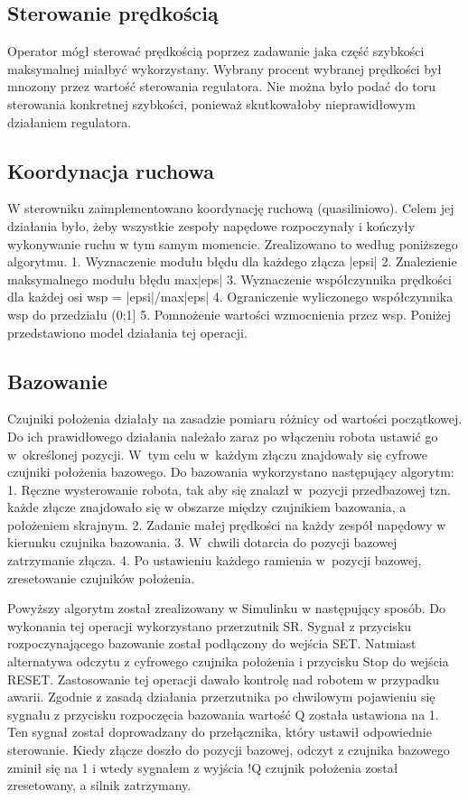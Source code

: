 \subsection{Sterowanie prędkością}
\label{subsec:sterowaniePredkoscia}

Operator mógł sterować prędkością poprzez zadawanie jaka część szybkości maksymalnej miałbyć wykorzystany. Wybrany procent wybranej prędkości był mnozony przez wartość sterowania regulatora. Nie można było podać do toru sterowania konkretnej szybkości, ponieważ skutkowałoby nieprawidłowym działaniem regulatora.

\subsection{Koordynacja ruchowa}
\label{subsec:koordynacjaRuchowa}

W sterowniku zaimplementowano koordynację ruchową (quasiliniowo). Celem jej działania było, żeby wszystkie zespoły napędowe rozpoczynały i kończyły wykonywanie ruchu w tym samym momencie. Zrealizowano to według poniższego algorytmu.
1. Wyznaczenie modułu błędu dla każdego złącza |epsi|
2. Znalezienie maksymalnego modułu błędu max|eps|
3. Wyznaczenie współczynnika prędkości dla każdej osi wsp = |epsi|/max|eps|
4. Ograniczenie wyliczonego współczynnika wsp do przedziału (0;1] 
5. Pomnożenie wartości wzmocnienia przez wsp.
Poniżej przedstawiono model działania tej operacji.

\subsection{Bazowanie}
\label{subsec:Bazowanie}

Czujniki położenia działały na zasadzie pomiaru różnicy od wartości początkowej. Do ich prawidłowego działania należało zaraz po włączeniu robota ustawić go w~określonej pozycji. W~tym celu w~każdym złączu znajdowały się cyfrowe czujniki położenia bazowego. Do bazowania wykorzystano następujący algorytm:
1. Ręczne wysterowanie robota, tak aby się znalazł w~pozycji przedbazowej tzn. każde złącze znajdowało się w obszarze między czujnikiem bazowania, a położeniem skrajnym.
2. Zadanie małej prędkości na każdy zespół napędowy w kierunku czujnika bazowania.
3. W~chwili dotarcia do pozycji bazowej zatrzymanie złącza.
4. Po ustawieniu każdego ramienia w~pozycji bazowej, zresetowanie czujników położenia.

Powyższy algorytm został zrealizowany w Simulinku w następujący sposób.
Do wykonania tej operacji wykorzystano przerzutnik SR. Sygnał z przycisku rozpoczynającego bazowanie został podłączony do wejścia SET. Natmiast alternatywa odczytu z cyfrowego czujnika położenia i przycisku Stop do wejścia RESET. Zastosowanie tej operacji dawało kontrolę nad robotem w przypadku awarii. Zgodnie z zasadą działania przerzutnika po chwilowym pojawieniu się sygnału z przycisku rozpoczęcia bazowania wartość Q została ustawiona na 1. Ten sygnał został doprowadzany do przełącznika, który ustawił odpowiednie sterowanie. Kiedy złącze doszło do pozycji bazowej, odczyt z czujnika bazowego zminił się na 1 i wtedy sygnałem z wyjścia !Q czujnik położenia został zresetowany, a silnik zatrzymany.

